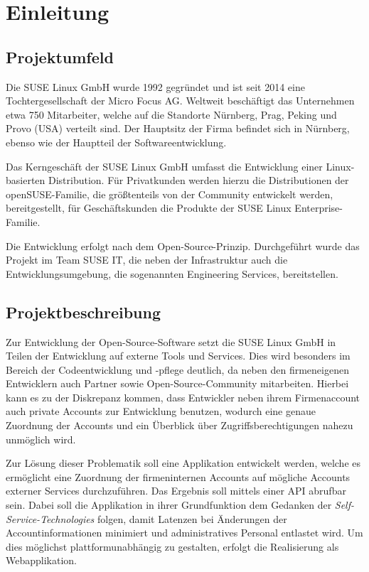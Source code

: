 \section{Einleitung}
\label{sec:Einleitung}

\subsection{Projektumfeld}
\label{sec:Projektumfeld}
Die SUSE Linux GmbH wurde 1992 gegründet und ist seit 2014 eine Tochtergesellschaft der Micro Focus
AG. Weltweit beschäftigt das Unternehmen etwa 750 Mitarbeiter, welche auf die Standorte Nürnberg,
Prag, Peking und Provo (USA) verteilt sind. Der Hauptsitz der Firma befindet sich in Nürnberg,
ebenso wie der Hauptteil der Softwareentwicklung.

Das Kerngeschäft der SUSE Linux GmbH umfasst die Entwicklung einer Linux-basierten Distribution.
Für Privatkunden werden hierzu die Distributionen der openSUSE-Familie, die größtenteils von der
Community entwickelt werden, bereitgestellt, für Geschäftskunden die Produkte der SUSE Linux
Enterprise-Familie.

Die Entwicklung erfolgt nach dem Open-Source-Prinzip.
Durchgeführt wurde das Projekt im Team SUSE IT, die neben der Infrastruktur auch die
Entwicklungsumgebung, die sogenannten Engineering Services, bereitstellen.

\subsection{Projektbeschreibung}
\label{sec:Projektbeschreibung}
Zur Entwicklung der Open-Source-Software setzt die SUSE Linux GmbH in Teilen der Entwicklung
auf externe Tools und Services. Dies wird besonders im Bereich der Codeentwicklung und -pflege
deutlich, da neben den firmeneigenen Entwicklern auch Partner sowie Open-Source-Community
mitarbeiten. Hierbei kann es zu der Diskrepanz kommen, dass Entwickler neben ihrem Firmenaccount
auch private Accounts zur Entwicklung benutzen, wodurch eine genaue Zuordnung der Accounts und
ein Überblick über Zugriffsberechtigungen nahezu unmöglich wird.

Zur Lösung dieser Problematik soll eine Applikation entwickelt werden, welche es ermöglicht
eine Zuordnung der firmeninternen Accounts auf mögliche Accounts externer Services durchzuführen.
Das Ergebnis soll mittels einer \acs{API} abrufbar sein.
Dabei soll die Applikation in ihrer Grundfunktion dem Gedanken der \textit{Self-Service-Technologies} folgen,
damit Latenzen bei Änderungen der Accountinformationen minimiert und administratives Personal
entlastet wird. Um dies möglichst plattformunabhängig zu gestalten, erfolgt die Realisierung als
Webapplikation.

